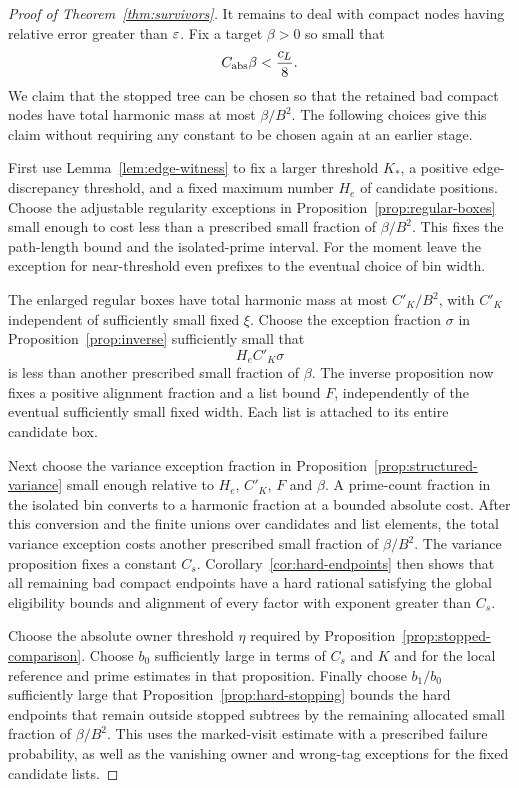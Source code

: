 \begin{proof}[Proof of Theorem~\ref{thm:survivors}]
It remains to deal with compact nodes having relative error greater
than $\varepsilon$. Fix a target $\beta>0$ so small that
\begin{equation}\label{eq:assembly-beta}
 C_{\rm abs}\beta<\frac{c_L}{8}.
\end{equation}
We claim that the stopped tree can be chosen so that the retained
bad compact nodes have total harmonic mass at most $\beta/B^2$.
The following choices give this claim without requiring any constant
to be chosen again at an earlier stage.

First use Lemma~\ref{lem:edge-witness} to fix a larger threshold
$K_*$, a positive edge-discrepancy threshold, and a fixed maximum
number $H_e$ of candidate positions. Choose the adjustable regularity
exceptions in Proposition~\ref{prop:regular-boxes} small enough to
cost less than a prescribed small fraction of $\beta/B^2$.
This fixes the path-length bound and the isolated-prime interval.
For the moment leave the exception for near-threshold even prefixes
to the eventual choice of bin width.

The enlarged regular boxes have total harmonic mass at most
$C'_K/B^2$, with $C'_K$ independent of sufficiently small fixed
$\xi$. Choose the exception fraction $\sigma$ in
Proposition~\ref{prop:inverse} sufficiently small that
\[
 H_eC'_K\sigma
\]
is less than another prescribed small fraction of $\beta$.
The inverse proposition now fixes a positive alignment fraction and
a list bound $F$, independently of the eventual sufficiently small
fixed width. Each list is attached to its entire candidate box.

Next choose the variance exception fraction in
Proposition~\ref{prop:structured-variance} small enough relative to
$H_e$, $C'_K$, $F$ and $\beta$. A prime-count fraction in the isolated
bin converts to a harmonic fraction at a bounded absolute cost.
After this conversion and the finite unions over candidates and
list elements, the total variance exception costs another prescribed
small fraction of $\beta/B^2$. The variance proposition fixes a
constant $C_s$. Corollary~\ref{cor:hard-endpoints} then shows that
all remaining bad compact endpoints have a hard rational satisfying
the global eligibility bounds and alignment of every factor with
exponent greater than $C_s$.

Choose the absolute owner threshold $\eta$ required by
Proposition~\ref{prop:stopped-comparison}. Choose $b_0$ sufficiently
large in terms of $C_s$ and $K$ and for the local reference and prime
estimates in that proposition. Finally choose $b_1/b_0$ sufficiently
large that Proposition~\ref{prop:hard-stopping} bounds the hard
endpoints that remain outside stopped subtrees by the remaining
allocated small fraction of $\beta/B^2$. This uses the marked-visit
estimate with a prescribed failure probability, as well as the
vanishing owner and wrong-tag exceptions for the fixed candidate
lists.


\end{proof}
